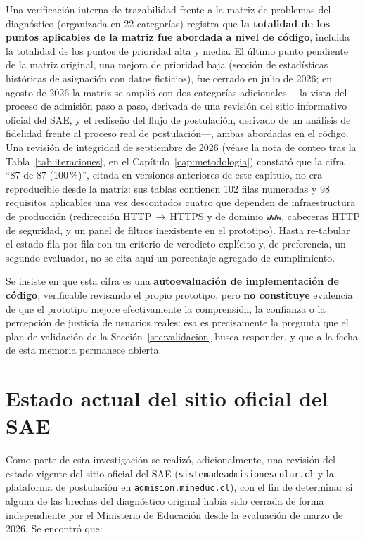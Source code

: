 Una verificación interna de trazabilidad frente a la matriz de problemas del diagnóstico (organizada en 22 categorías) registra que \textbf{la totalidad de los puntos aplicables de la matriz fue abordada a nivel de código}, incluida la totalidad de los puntos de prioridad alta y media. El último punto pendiente de la matriz original, una mejora de prioridad baja (sección de estadísticas históricas de asignación con datos ficticios), fue cerrado en julio de 2026; en agosto de 2026 la matriz se amplió con dos categorías adicionales —la vista del proceso de admisión paso a paso, derivada de una revisión del sitio informativo oficial del SAE, y el rediseño del flujo de postulación, derivado de un análisis de fidelidad frente al proceso real de postulación—, ambas abordadas en el código. Una revisión de integridad de septiembre de 2026 (véase la nota de conteo tras la Tabla~\ref{tab:iteraciones}, en el Capítulo~\ref{cap:metodologia}) constató que la cifra ``87 de 87 (100\,\%)'', citada en versiones anteriores de este capítulo, no era reproducible desde la matriz: sus tablas contienen 102 filas numeradas y 98 requisitos aplicables una vez descontados cuatro que dependen de infraestructura de producción (redirección HTTP\,$\to$\,HTTPS y de dominio \texttt{www}, cabeceras HTTP de seguridad, y un panel de filtros inexistente en el prototipo). Hasta re-tabular el estado fila por fila con un criterio de veredicto explícito y, de preferencia, un segundo evaluador, no se cita aquí un porcentaje agregado de cumplimiento.

Se insiste en que esta cifra es una \textbf{autoevaluación de implementación de código}, verificable revisando el propio prototipo, pero \textbf{no constituye} evidencia de que el prototipo mejore efectivamente la comprensión, la confianza o la percepción de justicia de usuarios reales: esa es precisamente la pregunta que el plan de validación de la Sección~\ref{sec:validacion} busca responder, y que a la fecha de esta memoria permanece abierta.

\section{Estado actual del sitio oficial del SAE}\label{sec:res-sitio-oficial}

Como parte de esta investigación se realizó, adicionalmente, una revisión del estado vigente del sitio oficial del SAE (\texttt{sistemadeadmisionescolar.cl} y la plataforma de postulación en \texttt{admision.mineduc.cl}), con el fin de determinar si alguna de las brechas del diagnóstico original había sido cerrada de forma independiente por el Ministerio de Educación desde la evaluación de marzo de 2026. Se encontró que:

